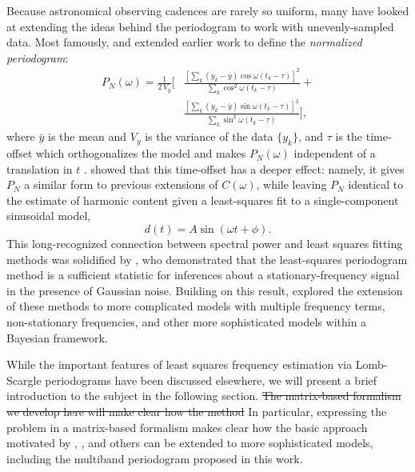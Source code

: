 \documentclass{emulateapj}
\newcommand{\eqlabel}[1]{\label{eq:#1}}
\newcommand{\new}[1]{{\color{red} #1}}
\newcommand{\old}[1]{{\sout{#1}}}
\begin{document}
Because astronomical observing cadences are rarely so uniform, many have looked at extending the ideas behind the periodogram to work with unevenly-sampled data. Most famously, \citet{Lomb76} and \citet{Scargle82} extended earlier work to define the {\it normalized periodogram}:
\begin{eqnarray}
  \eqlabel{LombScargle}
  P_N(\omega) = \frac{1}{2\,V_y}
  \Bigg[&\frac{\left[\sum_k(y_k - \bar{y})\cos\omega(t_k - \tau)\right]^2}
    {\sum_k \cos^2\omega(t_k - \tau)} +\nonumber\\
   & \frac{\left[\sum_k(y_k - \bar{y})\sin\omega(t_k - \tau)\right]^2}
    {\sum_k \sin^2\omega(t_k - \tau)}\Bigg],
\end{eqnarray}
where $\bar{y}$ is the mean and $V_y$ is the variance of the data $\{y_k\}$, and $\tau$ is the time-offset which \new{orthogonalizes the model and} makes $P_N(\omega)$ independent of a translation in $t$ \citep[see][for an in-depth discussion]{NumRec}. \citet{Lomb76} showed that this time-offset has a deeper effect: namely, it \new{gives $P_N$ a similar form to previous extensions of $C(\omega)$, while leaving} $P_N$ identical to the estimate of harmonic content given a least-squares fit to a single-component sinusoidal model,
\begin{equation}
  \eqlabel{SingleModel}
  d(t) = A\sin(\omega t + \phi).
\end{equation}
This long-recognized connection between spectral power and least squares fitting methods was solidified by \citet{Jaynes87}, who demonstrated that the least-squares periodogram method is a sufficient statistic for inferences about a stationary-frequency signal in the presence of Gaussian noise. Building on this result, \citet{Bretthorst88} explored the extension of these methods to more complicated models with multiple frequency terms, non-stationary frequencies, and other more sophisticated models within a Bayesian framework.

While the important features of least squares frequency estimation via Lomb-Scargle periodograms have been discussed elsewhere, we will present a brief introduction to the subject in the following section.
\old{The matrix-based formalism we develop here will make clear how the method} \new{In particular, expressing the problem in a matrix-based formalism makes clear how the basic approach motivated by \citet{Lomb76}, \citet{Scargle82}, and others} can be extended to more sophisticated models, including the multiband periodogram proposed in this work.
\end{document}

